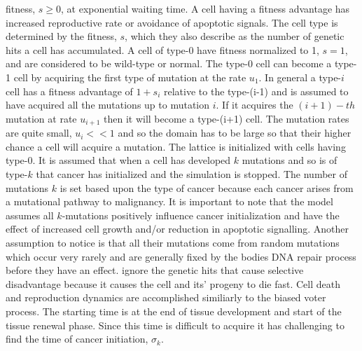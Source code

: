 \documentclass[\main/thesis.tex]{subfiles}
\begin{document}
fitness, $s {\ge} 0$, at exponential waiting time. A cell having a fitness 
advantage has increased reproductive rate or avoidance of apoptotic 
signals. The cell type is determined by the fitness, $s$, which they also 
describe as the number of genetic hits a cell has accumulated. A cell of type-0 
have fitness normalized to 1, $s {=} 1$, and are considered to be wild-type or 
normal. The type-0 cell can become a type-1 cell by acquiring the first type of 
mutation at the rate $u_1$. In general a type-$i$ cell has a fitness advantage 
of $1 + s_i$ relative to the type-(i-1) and is assumed to have acquired all the 
mutations up to mutation $i$. If it acquires the $(i+1)-th$ mutation at rate 
$u_{i{+}1}$ then it will become a type-(i+1) cell. The mutation rates are quite 
small, $u_i << 1$ and so the domain has to be large so that their higher chance 
a cell will acquire a mutation. The lattice is initialized with cells having 
type-0. It is assumed that when a cell has developed $k$ mutations and so is of 
type-$k$ that cancer has initialized and the simulation is stopped. The number of 
mutations $k$ is set based upon the type of cancer because each cancer arises 
from a mutational pathway to malignancy. It is important to note that the model 
assumes all $k$-mutations positively influence cancer initialization and have 
the effect of increased cell growth and/or reduction in apoptotic signalling. 
Another assumption to notice is that all their mutations come from random 
mutations which occur very rarely and are generally fixed by the bodies DNA 
repair process before they have an effect. \textcite{Foo} ignore the genetic 
hits that cause selective disadvantage because it causes the cell and its' 
progeny to die fast. Cell death and reproduction dynamics are accomplished 
similiarly to the biased voter process. The starting time is at the end of 
tissue development and start of the tissue renewal phase. Since this time is 
difficult to acquire it has challenging to find the time of cancer initiation, 
$\sigma_k$.
\end{document}
